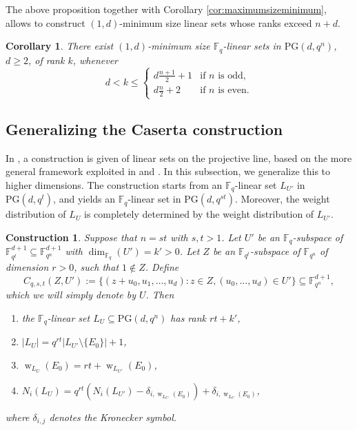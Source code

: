 \documentclass[11pt]{article}
\newtheorem{corollary}[theorem]{Corollary}
\newtheorem{construction}[theorem]{Construction}
\theoremstyle{definition}
\newcommand{\F}{{\mathbb F}}
\newcommand{\fq}{{\mathbb F}_{q}}
\newcommand{\PG}{\mathrm{PG}}
\DeclareMathOperator{\ww}{w}
\begin{document}
The above proposition together with Corollary \ref{cor:maximumsizeminimum}, allows to construct $(1,d)$-minimum size linear sets whose ranks exceed $n+d$. 
\begin{corollary}
There exist $(1,d)$-minimum size $\F_q$-linear sets in $\PG(d,q^n)$, $d \geq 2$, of rank $k$, whenever
\[
 d < k \leq \begin{cases}
  d \frac{n+1}2 +1 & \text{if $n$ is odd}, \\
  d \frac n 2 + 2 & \text{if $n$ is even.}
 \end{cases}
\]
\end{corollary}


\subsection{Generalizing the Caserta construction}

In \cite[Theorem 4.1]{napolitano2022classification}, a construction is given of linear sets on the projective line, based on the more general framework exploited in \cite{Gacs2003onarcs} and \cite{polverino1999blocking}.
In this subsection, we generalize this to higher dimensions.
The construction starts from an $\fq$-linear set $L_{U'}$ in $\PG(d,q^t)$, and yields an $\fq$-linear set in $\PG(d,q^{st})$.
Moreover, the weight distribution of $L_U$ is completely determined by the weight distribution of $L_{U'}$.

\begin{construction}
 \label{th:contructionfromqt}
Suppose that $n =s t$ with $s,t>1$.
Let $U'$ be an $\fq$-subspace of $\F_{q^t}^{d+1} \subseteq \F_{q^n}^{d+1}$ with $\dim_{\fq}(U')=k' > 0$.
Let $Z$ be an $\F_{q^t}$-subspace of $\F_{q^n}$ of dimension $r>0$, such that $1 \notin Z$.
Define 
\[ 
 C_{q,s,t}(Z,U') :=\{(z+ u_0, u_1,\ldots,u_{d}) \colon z \in Z, (u_0,\ldots, u_{d}) \in U'\} \subseteq \F_{q^n}^{d+1},
\]
which we will simply denote by $U$.
Then
\begin{enumerate}[(1)]
 \item the $\F_q$-linear set $L_U \subseteq \PG(d,q^n)$ has rank $r t + k'$,
 \item $|L_U| = q^{r t} |L_{U'} \setminus \{ E_0 \} | + 1$,
 \item $\ww_{L_U}(E_0) = r t + \ww_{L_{U'}}(E_0)$,
 \item $N_i(L_U) = q^{r t} ( N_i(L_{U'}) - \delta_{i,\ww_{L_{U'}}(E_0)} ) +  \delta_{i,\ww_{L_{U}}(E_0)}$,
\end{enumerate}
where $\delta_{i,j}$ denotes the Kronecker symbol.
\end{construction}
\end{document}
